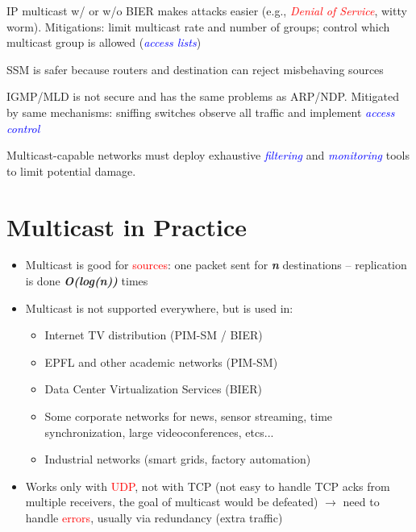\documentclass[11pt]{article}
\begin{document}
IP multicast w/ or w/o BIER makes attacks easier (e.g., \textcolor{red}{\textit{Denial of Service}}, witty worm). Mitigations: limit multicast rate and number of groups; control which multicast group is allowed (\textcolor{blue}{\textit{access lists}})


SSM is safer because routers and destination can reject misbehaving sources

IGMP/MLD is not secure and has the same problems as ARP/NDP. Mitigated by same mechanisms: sniffing switches observe all traffic and implement \textcolor{blue}{\textit{access control}}

Multicast-capable networks must deploy exhaustive \textcolor{blue}{\textit{filtering}} and \textcolor{blue}{\textit{monitoring}} tools to limit potential damage.

\section*{Multicast in Practice}
\begin{itemize}
	\item Multicast is good for \textcolor{red}{sources}: one packet sent for \textbf{\textit{n}} destinations -- replication is done \textbf{\textit{O(log(n))}} times
	\item Multicast is not supported everywhere, but is used in:
		\begin{itemize}
			\item Internet TV distribution (PIM-SM / BIER)
			\item EPFL and other academic networks (PIM-SM)
			\item Data Center Virtualization Services (BIER)
			\item Some corporate networks for news, sensor streaming, time synchronization, large videoconferences, etcs...
			\item Industrial networks (smart grids, factory automation)
		\end{itemize}
	\item Works only with \textcolor{red}{UDP}, not with TCP (not easy to handle TCP acks from multiple receivers, the goal of multicast would be defeated) $\rightarrow$ need to handle \textcolor{red}{errors}, usually via redundancy (extra traffic)
\end{itemize}
\end{document}
